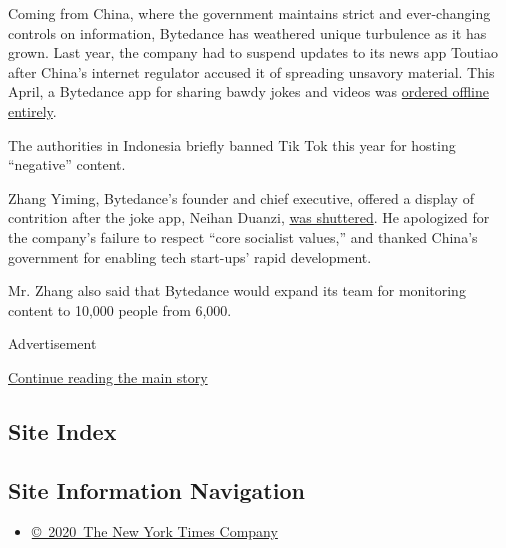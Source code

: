 Coming from China, where the government maintains strict and
ever-changing controls on information, Bytedance has weathered unique
turbulence as it has grown. Last year, the company had to suspend
updates to its news app Toutiao after China's internet regulator accused
it of spreading unsavory material. This April, a Bytedance app for
sharing bawdy jokes and videos was
\href{https://www.nytimes.com/2018/04/11/technology/china-toutiao-bytedance-censor.html}{ordered
offline entirely}.

The authorities in Indonesia briefly banned Tik Tok this year for
hosting ``negative'' content.

Zhang Yiming, Bytedance's founder and chief executive, offered a display
of contrition after the joke app, Neihan Duanzi,
\href{https://www.nytimes.com/2018/04/12/business/china-bytedance-duanzi-censor.html}{was
shuttered}. He apologized for the company's failure to respect ``core
socialist values,'' and thanked China's government for enabling tech
start-ups' rapid development.

Mr. Zhang also said that Bytedance would expand its team for monitoring
content to 10,000 people from 6,000.

Advertisement

\protect\hyperlink{after-bottom}{Continue reading the main story}

\hypertarget{site-index}{%
\subsection{Site Index}\label{site-index}}

\hypertarget{site-information-navigation}{%
\subsection{Site Information
Navigation}\label{site-information-navigation}}

\begin{itemize}
\tightlist
\item
  \href{https://help.nytimes.com/hc/en-us/articles/115014792127-Copyright-notice}{©~2020~The
  New York Times Company}
\end{itemize}


